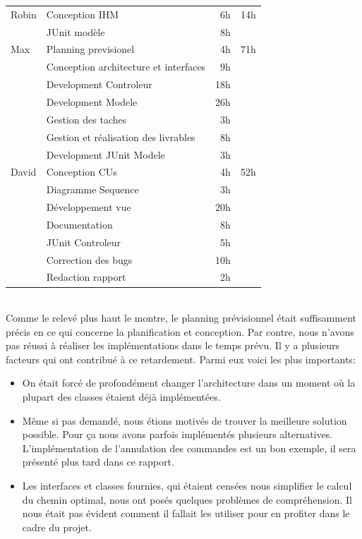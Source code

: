 \documentclass[10pt,a4paper]{book}
\begin{document}
\begin{longtable}{|l|l|r|l|}
\hline
Robin & Conception IHM & 6h & 14h\\
\cline{2-3}
& JUnit modèle & 8h & ~\\
\hline

\hline
Max & Planning previsionel & 4h & 71h\\
\cline{2-3}
& Conception architecture et interfaces & 9h & ~\\
\cline{2-3}
& Development Controleur & 18h & ~\\
\cline{2-3}
& Development Modele & 26h & ~\\
\cline{2-3}
& Gestion des taches & 3h & ~\\
\cline{2-3}
& Gestion et réalisation des livrables & 8h & ~\\
\cline{2-3}
& Development JUnit Modele & 3h & ~\\
\hline

\hline
David & Conception CUs & 4h & 52h\\
\cline{2-3}
& Diagramme Sequence & 3h & ~\\
\cline{2-3}
& Développement vue & 20h & ~\\
\cline{2-3}
& Documentation & 8h & ~\\
\cline{2-3}
& JUnit Controleur & 5h & ~\\
\cline{2-3}
& Correction des bugs & 10h & ~\\
\cline{2-3}
& Redaction rapport & 2h & ~\\
\hline
\end{longtable}
~\\Comme le relevé plus haut le montre, le planning prévisionnel était suffisamment précis en ce qui concerne la planification et conception. Par contre, nous n'avons pas réussi à réaliser les implémentations dans le temps prévu. Il y a plusieurs facteurs qui ont contribué à ce retardement. Parmi eux voici les plus importants:
\begin{itemize}
	\item{On était forcé de profondément changer l'architecture dans un moment où la plupart des classes étaient déjà implémentées.}
	\item{Même si pas demandé, nous étions motivés de trouver la meilleure solution possible. Pour ça nous avons parfois implémentés plusieurs alternatives. L'implémentation de l'annulation des commandes est un bon exemple, il sera présenté plus tard dans ce rapport.}
	\item{Les interfaces et classes fournies, qui étaient censées nous simplifier le calcul du chemin optimal, nous ont posés quelques problèmes de compréhension. Il nous était pas évident comment il fallait les utiliser pour en profiter dans le cadre du projet.}
\end{itemize}
\end{document}
